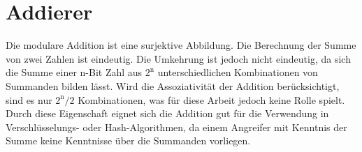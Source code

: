 \section{Addierer}
\label{sec:grundlagen_add}

Die modulare Addition ist eine surjektive Abbildung. Die Berechnung der Summe von zwei Zahlen ist eindeutig. Die Umkehrung ist jedoch nicht eindeutig,
da sich die Summe einer n-Bit Zahl aus $2^{\text{n}}$ unterschiedlichen Kombinationen von Summanden bilden lässt. Wird die Assoziativität der Addition berücksichtigt,
sind es nur $2^{\text{n}}/2$ Kombinationen, was für diese Arbeit jedoch keine Rolle spielt. Durch diese Eigenschaft eignet sich die Addition gut für die Verwendung
in Verschlüsselungs- oder Hash-Algorithmen, da einem Angreifer mit Kenntnis der Summe keine Kenntnisse über die Summanden vorliegen.

